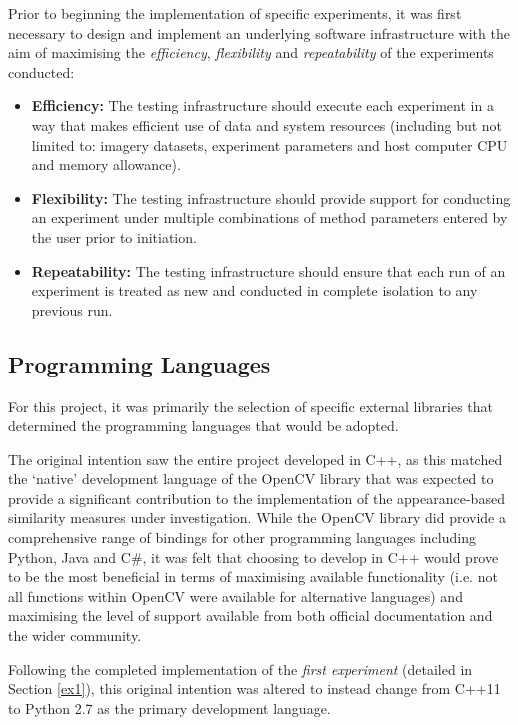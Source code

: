 Prior to beginning the implementation of specific experiments, it was first necessary to design and implement an underlying software infrastructure with the aim of maximising the \textit{efficiency}, \textit{flexibility} and \textit{repeatability} of the experiments conducted:

\begin{itemize}
	\item \textbf{Efficiency:} The testing infrastructure should execute each experiment in a way that makes efficient use of data and system resources (including but not limited to: imagery datasets, experiment parameters and host computer CPU and memory allowance).
	\item \textbf{Flexibility:} The testing infrastructure should provide support for conducting an experiment under multiple combinations of method parameters entered by the user prior to initiation.  
	\item \textbf{Repeatability:} The testing infrastructure should ensure that each run of an experiment is treated as new and conducted in complete isolation to any previous run. 
\end{itemize}

\subsection{Programming Languages}
\label{lang}

For this project, it was primarily the selection of specific external libraries that determined the programming languages that would be adopted.

The original intention saw the entire project developed in C++, as this matched the `native' development language of the OpenCV library \cite{opencv} that was expected to provide a significant contribution to the implementation of the appearance-based similarity measures under investigation. While the OpenCV library did provide a comprehensive range of bindings for other programming languages including Python, Java and C\#, it was felt that choosing to develop in C++ would prove to be the most beneficial in terms of maximising available functionality (i.e. not all functions within OpenCV were available for alternative languages) and maximising the level of support available from both official documentation and the wider community. 

Following the completed implementation of the \textit{first experiment} (detailed in Section \ref{ex1}), this original intention was altered to instead change from C++11 to Python 2.7 as the primary development language. 

